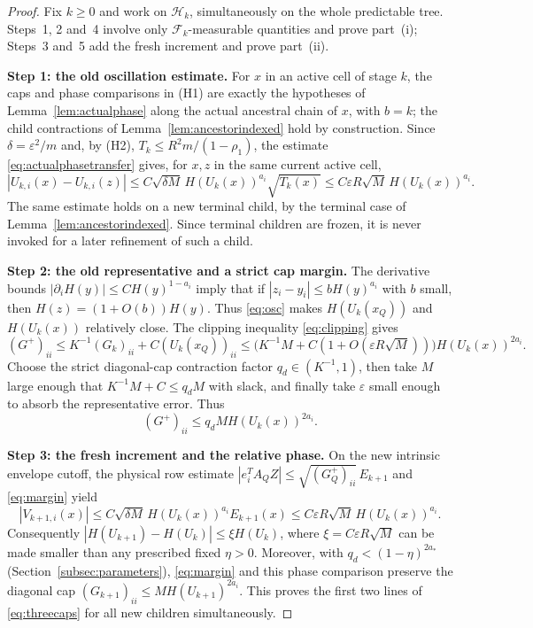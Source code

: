 \documentclass[11pt]{article}
\theoremstyle{definition}
\theoremstyle{remark}
\numberwithin{equation}{section}
\newcommand{\F}{\mathcal F}
\begin{document}
\begin{proof}
Fix $k\ge0$ and work on $\mathcal H_k$, simultaneously on the whole
predictable tree. Steps~1, 2 and~4 involve only $\F_k$-measurable
quantities and prove part~(i); Steps~3 and~5 add the fresh increment
and prove part~(ii).

\textbf{Step 1: the old oscillation estimate.}
For $x$ in an active cell of stage $k$, the
caps and phase comparisons in (H1) are exactly the hypotheses of
Lemma~\ref{lem:actualphase} along the actual ancestral chain of $x$,
with $b=k$; the child contractions of
Lemma~\ref{lem:ancestorindexed} hold by construction. Since
$\delta=\varepsilon^2/m$ and, by (H2),
$T_k\le R^2m/(1-\rho_1)$, the estimate
\eqref{eq:actualphasetransfer} gives, for $x,z$ in the same current
active cell,
\begin{equation}\label{eq:osc}
 |U_{k,i}(x)-U_{k,i}(z)|
 \le C\sqrt{\delta M}\,H(U_k(x))^{a_i}\sqrt{T_k(x)}
 \le C\varepsilon R\sqrt M\,H(U_k(x))^{a_i}.
\end{equation}
The same estimate holds on a new terminal child, by the terminal case
of Lemma~\ref{lem:ancestorindexed}. Since terminal children are
frozen, it is never invoked for a later refinement of such a child.

\textbf{Step 2: the old representative and a strict cap margin.}
The derivative bounds $|\partial_iH(y)|\le CH(y)^{1-a_i}$ imply that
if $|z_i-y_i|\le bH(y)^{a_i}$ with $b$ small, then
$H(z)=(1+O(b))H(y)$. Thus \eqref{eq:osc} makes
$H(U_k(x_Q))$ and $H(U_k(x))$ relatively close.
The clipping inequality \eqref{eq:clipping} gives
\[
 (G^+)_{ii}\le K^{-1}(G_k)_{ii}+C(U_k(x_Q))_{ii}
 \le\bigl(K^{-1}M+C(1+O(\varepsilon R\sqrt M))\bigr)
            H(U_k(x))^{2a_i}.
\]
\label{not:qd}
Choose the strict diagonal-cap contraction factor $q_d\in(K^{-1},1)$,
then take $M$ large enough that
$K^{-1}M+C\le q_dM$ with slack, and finally take $\varepsilon$
small enough to absorb the representative error. Thus
\begin{equation}\label{eq:margin}
 (G^+)_{ii}\le q_dM H(U_k(x))^{2a_i}.
\end{equation}

\textbf{Step 3: the fresh increment and the relative phase.}
On the new intrinsic envelope cutoff, the physical row estimate
$|e_i^TA_QZ|\le\sqrt{(G_Q^+)_{ii}}\,E_{k+1}$ and
\eqref{eq:margin} yield
\[
 |V_{k+1,i}(x)|\le
 C\sqrt{\delta M}\,H(U_k(x))^{a_i}E_{k+1}(x)
 \le C\varepsilon R\sqrt M\,H(U_k(x))^{a_i}.
\]
\label{not:xi}
Consequently $|H(U_{k+1})-H(U_k)|\le\xi H(U_k)$,
where $\xi=C\varepsilon R\sqrt M$ can be made smaller than
any prescribed fixed $\eta>0$. Moreover, with
$q_d<(1-\eta)^{2a_*}$ (Section~\ref{subsec:parameters}),
\eqref{eq:margin} and this phase comparison preserve the diagonal cap
$(G_{k+1})_{ii}\le M H(U_{k+1})^{2a_i}$.
This proves the first two lines of \eqref{eq:threecaps}
for all new children simultaneously.


\end{proof}
\end{document}

